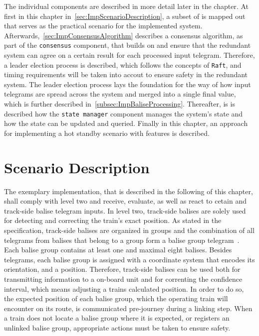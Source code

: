 The individual components are described in more detail later in the chapter.
At first in this chapter in~\autoref{sec:ImpScenarioDescription}, a subset of  is mapped out that serves as the practical scenario for the implemented system.
Afterwards,~\autoref{sec:ImpConsensusAlgorithm} describes a consensus algorithm, as part of the \texttt{consensus} component, that builds on  and ensure that the redundant system can agree on a certain result for each processed input telegram.
Therefore, a leader election process is described, which follows the concepts of \texttt{Raft}, and timing requirements will be taken into accout to ensure safety in the redundant system.
The leader election process lays the foundation for the way of how input telegrams are spread across the system and merged into a single final value, which is further described in~\autoref{subsec:ImpBaliseProcessing}.
Thereafter, is is described how the \texttt{state manager} component manages the system's state and how the state can be updated and queried.
Finally in this chapter, an approach for implementing a hot standby scenario with  features is described.

\section{Scenario Description}
\label{sec:ImpScenarioDescription}
The exemplary implementation, that is described in the following of this chapter, shall comply with  level two and receive, evaluate, as well as react to cetain  and track-side balise telegram inputs.
In  level two, track-side balises are solely used for detecting and correcting the train's exact position.
As stated in the  specification, track-side balises are organized in groups and the combination of all telegrams from balises that belong to a group form a balise group telegram~\cite{ETCS26}.
Each balise group contains at least one and maximal eight balises.
Besides telegrams, each balise group is assigned with a coordinate system that encodes its orientation, and a position.
Therefore, track-side balises can be used both for transmitting information to a on-board unit and for correnting the confidence interval, which means adjusting a trains calculated position.
In order to do so, the expected position of each balise group, which the operating train will encounter on its route, is communicated pre-journey during a linking step.
When a train does not locate a balise group where it is expected, or registers an unlinked balise group, appropriate actions must be taken to ensure safety.

